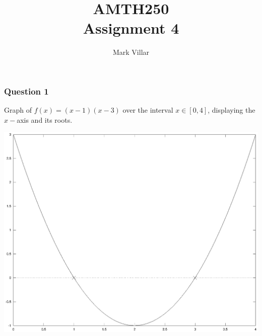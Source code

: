 \documentclass[11pt,a4paper]{article}
\title{AMTH250 \\ Assignment 4}
\author{Mark Villar}
\begin{document}
\maketitle

\subsubsection*{Question 1} Graph of $f(x)=(x-1)(x-3)$ over the interval $x \in [0,4]$, displaying the $x-$axis and its roots.
\begin{center}
	\includegraphics[width=1.1\textwidth]{plot1.eps}
\end{center}

\pagebreak
\end{document}
